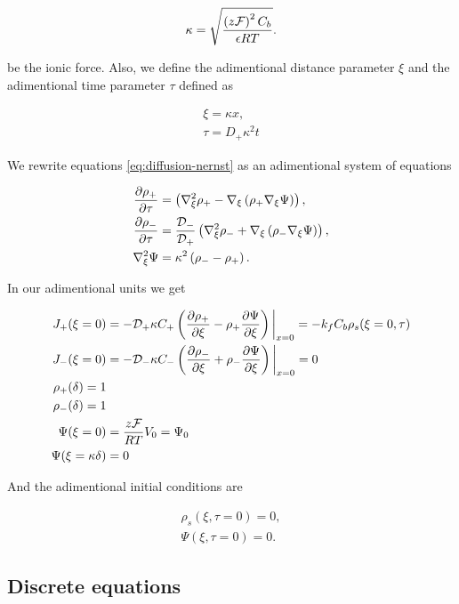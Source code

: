 \begin{align}
	\kappa = \sqrt{\frac{\left({z\mathcal{F}}\right)^2C_b}{\epsilon RT}}.
\end{align}

be the ionic force. Also, we define the adimentional distance parameter $\xi$ and the adimentional time parameter $\tau$ defined as

\begin{align}
	\xi = \kappa x, \\
	\tau = D_+\kappa^2 t
\end{align}

We rewrite equations \ref{eq:diffusion-nernst} as an adimentional system of equations

\begin{align}
\label{eq:adimetional-diffusion-nernst}
    \frac{\partial \rho_+}{\partial \tau} &= \left({\nabla_\xi^2 \rho_+ - \nabla_\xi\left({\rho_+ \nabla_\xi \Psi}\right)}\right), \\
    \frac{\partial \rho_-}{\partial \tau} &= \frac{\mathcal{D}_-}{\mathcal{D_+}}\left({\nabla_\xi^2 \rho_- + \nabla_\xi\left({\rho_- \nabla_\xi \Psi}\right)}\right), \\
    \nabla_\xi^2 \Psi &= \kappa^2\left({\rho_- - \rho_+}\right).
\end{align}


In our adimentional units we get

\begin{align}
    J_+(\xi = 0) &= -\mathcal{D}_+\kappa C_+\left({\frac{\partial \rho_+}{\partial \xi} - \rho_+ \frac{\partial\Psi}{\partial \xi}}\right)\bigg|_{x= 0}= -k_f C_b\rho_s(\xi = 0, \tau)\\
    J_-(\xi = 0) &= -\mathcal{D}_-\kappa C_-\left({\frac{\partial \rho_-}{\partial \xi} + \rho_- \frac{\partial\Psi}{\partial \xi}}\right)  \bigg|_{x= 0} = 0\\
    \rho_+(\delta) = 1\\
    \rho_-(\delta) = 1\\
    \Psi(\xi = 0) &= \frac{z\mathcal{F}}{RT} V_0 = \Psi_0\\
    \Psi(\xi = \kappa \delta) &= 0
\end{align}

And the adimentional initial conditions are

\begin{align}
	\rho_s(\xi, \tau = 0) = 0,\\
	\Psi (\xi, \tau = 0) = 0.
\end{align}


\subsection{Discrete equations}

